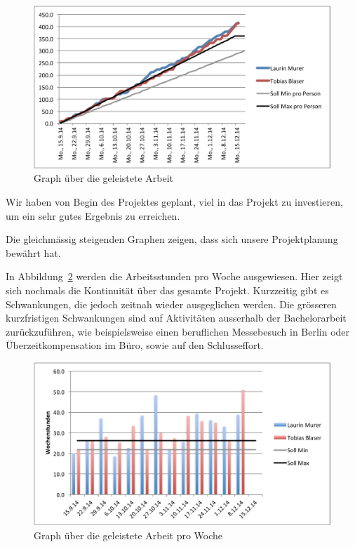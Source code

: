 	\begin{figure}[H]
		\includegraphics[width=\textwidth]{projectPlan/media/img/workGraph.pdf}
		\centering
		\caption{Graph über die geleistete Arbeit}
		\label{fig:workGraph}
	\end{figure}
	
	Wir haben von Begin des Projektes geplant, viel in das Projekt zu investieren, um ein sehr gutes Ergebnis zu erreichen.
	
	Die gleichmässig steigenden Graphen zeigen, dass sich unsere Projektplanung bewährt hat.
	
	In Abbildung~\ref{fig:weekhours} werden die Arbeitsstunden pro Woche ausgewiesen.
	Hier zeigt sich nochmals die Kontinuität über das gesamte Projekt.
	Kurzzeitig gibt es Schwankungen, die jedoch zeitnah wieder ausgeglichen werden.
	Die grösseren kurzfristigen Schwankungen sind auf Aktivitäten ausserhalb der Bachelorarbeit zurückzuführen,
	wie beispielsweise einen beruflichen Messebesuch in Berlin oder Überzeitkompensation im Büro,
	sowie auf den Schlusseffort.

	\begin{figure}[H]
		\includegraphics[width=\textwidth]{projectPlan/media/img/weekhours.pdf}
		\centering
		\caption{Graph über die geleistete Arbeit pro Woche}
		\label{fig:weekhours}
	\end{figure}

